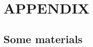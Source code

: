 \documentclass[11pt]{article}
\begin{document}
%    








\newpage





\setcounter{table}{0}
\renewcommand{\thetable}{A\arabic{table}}

\setcounter{figure}{0}
\renewcommand{\thefigure}{A\arabic{figure}}

\setcounter{section}{0}
\setcounter{subsection}{0}
\renewcommand\thesection{A\arabic{section}}
\renewcommand\thesubsection{\thesection\arabic{subsection}}

\appendix

\section{APPENDIX}

\subsection{Some materials}
\end{document}
